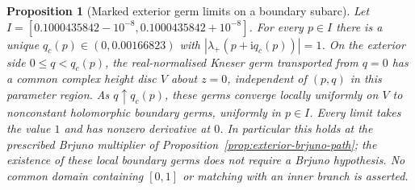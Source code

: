 \documentclass[11pt,a4paper]{article}
\newtheorem{proposition}[theorem]{Proposition}
\theoremstyle{definition}
\newcommand{\ii}{\mathrm{i}}
\begin{document}
\begin{proposition}[Marked exterior germ limits on a boundary subarc]
\label{prop:exterior-brjuno-germ-limit}
Let $I=[0.1000435842-10^{-8},0.1000435842+10^{-8}]$.
For every $p\in I$ there is a unique
$q_c(p)\in(0,0.00166823)$ with
$|\lambda_+(p+\ii q_c(p))|=1$.  On the exterior side
$0\le q<q_c(p)$, the real-normalised Kneser germ transported from
$q=0$ has a common complex height disc $V$ about $z=0$,
independent of $(p,q)$ in this parameter region.  As
$q\uparrow q_c(p)$, these germs converge locally uniformly on $V$
to nonconstant holomorphic boundary germs, uniformly in $p\in I$.
Every limit takes the value $1$ and has nonzero derivative at $0$.
In particular this holds at the prescribed Brjuno multiplier of
Proposition~\ref{prop:exterior-brjuno-path}; the existence of these
local boundary germs does not require a Brjuno hypothesis.  No
common domain containing $[0,1]$ or matching with an inner branch
is asserted.
\end{proposition}
\end{document}
